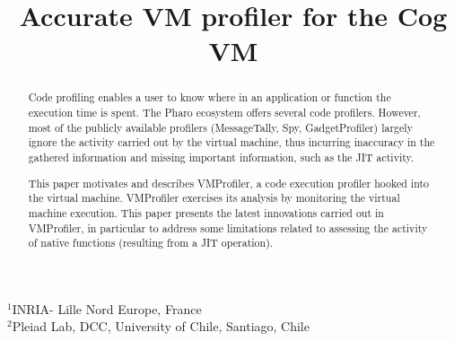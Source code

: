 \documentclass[10pt,preprint,nonatbib]{sigplanconf}
\newcommand{\Title}{Accurate VM profiler for the Cog VM}
\newcommand{\Authors}{Sophie Kaleba, Cl\'ement B\'era, Alexandre Bergel$^3$\\[2 ex]
$^3$Pleiad Lab, DCC, University of Chile}
\begin{document}
\setlength{\pdfpageheight}{\paperheight}
\setlength{\pdfpagewidth}{\paperwidth}



\title{\Title}


           {$^1$INRIA- Lille Nord Europe, France\\
             $^2$Pleiad Lab, DCC, University of Chile, Santiago, Chile}
           {}


\maketitle

\begin{abstract}

Code profiling enables a user to know where in an application or function the execution time is spent. The Pharo ecosystem offers several code profilers. However, most of the publicly available profilers (MessageTally, Spy, GadgetProfiler) largely ignore the activity carried out by the virtual machine, thus incurring inaccuracy in the gathered information and missing important information, such as the JIT activity.

This paper motivates and describes VMProfiler, a code execution profiler hooked into the virtual machine. VMProfiler exercises its analysis by monitoring the virtual machine execution. This paper presents the latest innovations carried out in VMProfiler, in particular to address some limitations related to assessing the activity of native functions (resulting from a JIT operation).

%
%

\end{abstract}
\end{document}
